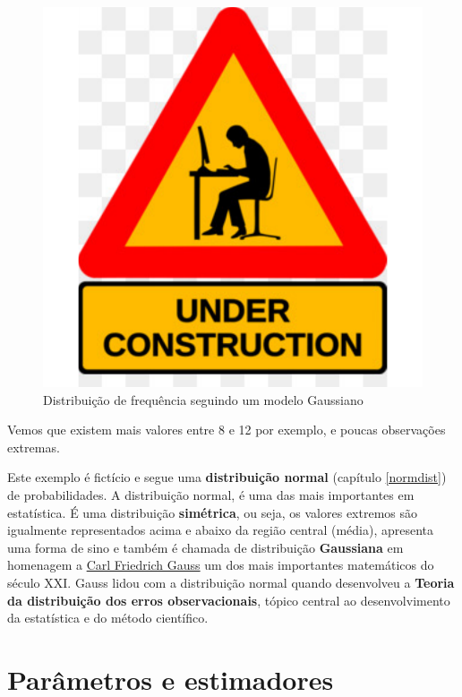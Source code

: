 \documentclass[
]{book}
\begin{document}
\begin{figure}

{\centering \includegraphics{probest-cambientais_files/figure-latex/unnamed-chunk-234-1} 

}

\caption{Distribuição de frequência seguindo um modelo Gaussiano}\label{fig:unnamed-chunk-234}
\end{figure}

Vemos que existem mais valores entre 8 e 12 por exemplo, e poucas observações extremas.

Este exemplo é fictício e segue uma \textbf{distribuição normal} (capítulo \ref{normdist}) de probabilidades. A distribuição normal, é uma das mais importantes em estatística. É uma distribuição \textbf{simétrica}, ou seja, os valores extremos são igualmente representados acima e abaixo da região central (média), apresenta uma forma de sino e também é chamada de distribuição \textbf{Gaussiana} em homenagem a \href{https://en.wikipedia.org/wiki/Carl_Friedrich_Gauss}{Carl Friedrich Gauss} um dos mais importantes matemáticos do século XXI. Gauss lidou com a distribuição normal quando desenvolveu a \textbf{Teoria da distribuição dos erros observacionais}, tópico central ao desenvolvimento da estatística e do método científico.

\hypertarget{paruxe2metros-e-estimadores}{%
\section{Parâmetros e estimadores}\label{paruxe2metros-e-estimadores}}
\end{document}
